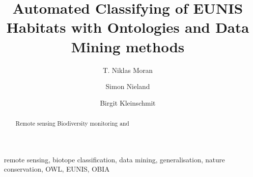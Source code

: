\documentclass[authoryear, review,12pt,number]{elsarticle}
\begin{document}
\begin{frontmatter}
\linenumbers
\title{Automated Classifying of EUNIS Habitats with Ontologies and Data Mining
methods}


\author[TUB]{T. Niklas Moran}

\author[TUB]{Simon Nieland}
\author[TUB]{Birgit Kleinschmit}


\address[TUB]{Geoinformation in Environmental Planning Lab, Technische
Universit\"at Berlin, Stra\ss e des 17. Juni 145, 10623 Berlin, Germany}


\begin{abstract}
Remote sensing Biodiversity monitoring and 
\end{abstract}

\begin{keyword}
remote sensing, biotope classification, data mining,
generalisation, nature conservation, OWL, EUNIS, OBIA
\end{keyword}

\end{frontmatter}

\linenumbers
\end{document}

